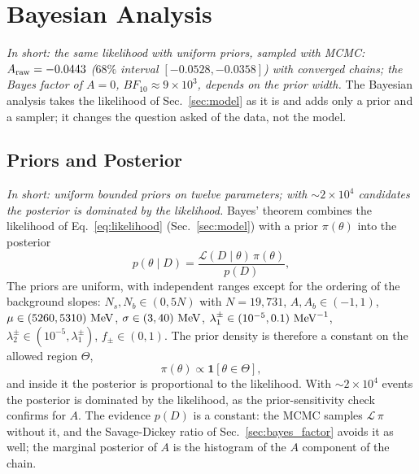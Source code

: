 \section{Bayesian Analysis}
\label{sec:bayesian}
\label{app:ext_bayes}
\emph{In short: the same likelihood with uniform priors, sampled with MCMC: $A_{\mathrm{raw}}=-0.0443$ ($68\%$ interval $[-0.0528,-0.0358]$) with converged chains; the Bayes factor of $A=0$, $BF_{10}\approx9\times10^3$, depends on the prior width.}
The Bayesian analysis takes the likelihood of Sec.~\ref{sec:model} as it is and adds only a prior and a sampler; it changes the question asked of the data, not the model.

\subsection{Priors and Posterior}
\label{sec:bayes_prior}
\emph{In short: uniform bounded priors on twelve parameters; with $\sim2\times10^4$ candidates the posterior is dominated by the likelihood.}
Bayes' theorem combines the likelihood of Eq.~\eqref{eq:likelihood} (Sec.~\ref{sec:model}) with a prior $\pi(\theta)$ into the posterior
\begin{equation}
p(\theta\mid D)=\frac{\mathcal{L}(D\mid\theta)\,\pi(\theta)}{p(D)},
\label{eq:bayes}
\end{equation}
The priors are uniform, with independent ranges except for the ordering of the background slopes: $N_s,N_b\in(0,5N)$ with $N=19{,}731$, $A,A_b\in(-1,1)$, $\mu\in(5260,5310)\,\,\text{Me\hspace{-.08em}V}$, $\sigma\in(3,40)\,\,\text{Me\hspace{-.08em}V}$, $\lambda_1^{\pm}\in(10^{-5},0.1)\,\,\text{Me\hspace{-.08em}V}^{-1}$, $\lambda_2^{\pm}\in(10^{-5},\lambda_1^{\pm})$, $f_{\pm}\in(0,1)$. The prior density is therefore a constant on the allowed region $\Theta$,
\begin{equation}
\pi(\theta)\propto\mathbf{1}\left[\theta\in\Theta\right],
\label{eq:prior}
\end{equation}
and inside it the posterior is proportional to the likelihood. With $\sim$$2\times10^4$ events the posterior is dominated by the likelihood, as the prior-sensitivity check confirms for $A$. The evidence $p(D)$ is a constant: the MCMC samples $\mathcal{L}\,\pi$ without it, and the Savage-Dickey ratio of Sec.~\ref{sec:bayes_factor} avoids it as well; the marginal posterior of $A$ is the histogram of the $A$ component of the chain.

